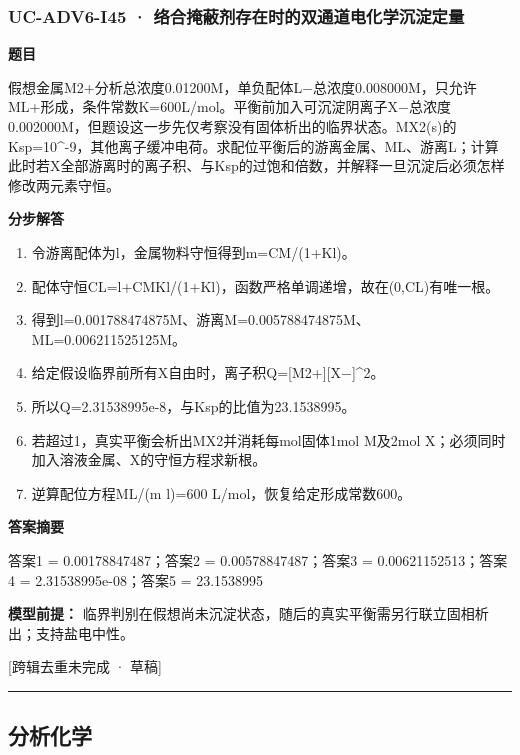 \documentclass[UTF8,11pt,a4paper]{ctexart}
\begin{document}
\subsubsection*{UC-ADV6-I45 · 络合掩蔽剂存在时的双通道电化学沉淀定量}
\noindent\textbf{题目}\par
假想金属M2+分析总浓度0.01200M，单负配体L−总浓度0.008000M，只允许ML+形成，条件常数K=600L/mol。平衡前加入可沉淀阴离子X−总浓度0.002000M，但题设这一步先仅考察没有固体析出的临界状态。MX2(s)的Ksp=10\textasciicircum{}-9，其他离子缓冲电荷。求配位平衡后的游离金属、ML、游离L；计算此时若X全部游离时的离子积、与Ksp的过饱和倍数，并解释一旦沉淀后必须怎样修改两元素守恒。\par
\medskip\noindent\textbf{分步解答}
\begin{enumerate}
\item 令游离配体为l，金属物料守恒得到m=CM/(1+Kl)。
\item 配体守恒CL=l+CMKl/(1+Kl)，函数严格单调递增，故在(0,CL)有唯一根。
\item 得到l=0.001788474875M、游离M=0.005788474875M、ML=0.006211525125M。
\item 给定假设临界前所有X自由时，离子积Q=[M2+][X−]\textasciicircum{}2。
\item 所以Q=2.31538995e-8，与Ksp的比值为23.1538995。
\item 若超过1，真实平衡会析出MX2并消耗每mol固体1mol M及2mol X；必须同时加入溶液金属、X的守恒方程求新根。
\item 逆算配位方程ML/(m l)=600 L/mol，恢复给定形成常数600。
\end{enumerate}
\noindent\textbf{答案摘要}\par
答案1 = 0.00178847487；答案2 = 0.00578847487；答案3 = 0.00621152513；答案4 = 2.31538995e-08；答案5 = 23.1538995\par
\noindent\textbf{模型前提：}
临界判别在假想尚未沉淀状态，随后的真实平衡需另行联立固相析出；支持盐电中性。\par
\noindent\textcolor{red!65!black}{[跨辑去重未完成 · 草稿]} \par
\medskip\hrule\medskip
\subsection*{分析化学}
\end{document}
